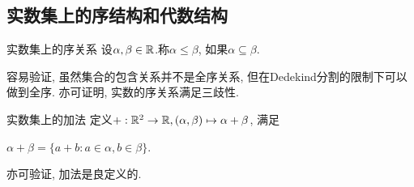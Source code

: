 \subsection{实数集上的序结构和代数结构}

\begin{definition}{实数集上的序关系}
	设$\alpha , \beta \in \mathbb{R}$.称$\alpha \leq \beta$, 如果$\alpha \subseteq \beta$.
\end{definition}

容易验证, 虽然集合的包含关系并不是全序关系, 但在Dedekind分割的限制下可以做到全序. 亦可证明, 实数的序关系满足三歧性. 

\begin{definition}{实数集上的加法}
	定义$+: \mathbb{R} ^2 \to \mathbb{R} , (\alpha , \beta) \mapsto \alpha + \beta$, 满足
	\begin{center}
		$\alpha + \beta = \{ a+b: a \in \alpha , b \in \beta \}.$
	\end{center}
\end{definition}

亦可验证, 加法是良定义的. 

